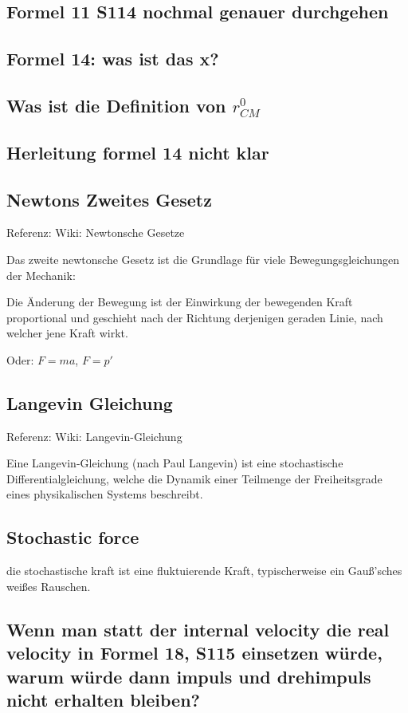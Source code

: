 \documentclass[]{article}
\begin{document}
\subsection{Formel 11 S114 nochmal genauer durchgehen}

\subsection{Formel 14: was ist das x?}

\subsection{Was ist die Definition von $r_{CM}^0$}

\subsection{Herleitung formel 14 nicht klar}

\subsection{Newtons Zweites Gesetz}
Referenz: Wiki: Newtonsche Gesetze

Das zweite newtonsche Gesetz ist die Grundlage für viele Bewegungsgleichungen der Mechanik:

\glqq Die Änderung der Bewegung ist der Einwirkung der bewegenden Kraft proportional und geschieht nach der Richtung derjenigen geraden Linie, nach welcher jene Kraft wirkt. \grqq

Oder: $F=ma$, $F=p'$

\subsection{Langevin Gleichung}
Referenz: Wiki: Langevin-Gleichung

Eine Langevin-Gleichung (nach Paul Langevin) ist eine stochastische Differentialgleichung, welche die Dynamik einer Teilmenge der Freiheitsgrade eines physikalischen Systems beschreibt. 

\subsection{Stochastic force}
die stochastische kraft ist eine fluktuierende Kraft, typischerweise ein Gauß'sches weißes Rauschen. 

\subsection{Wenn man statt der internal velocity die real velocity in Formel 18, S115 einsetzen würde, warum würde dann impuls und drehimpuls nicht erhalten bleiben?}
\end{document}
